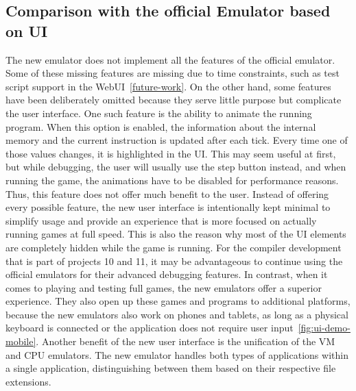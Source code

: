 
\subsection{Comparison with the official Emulator based on UI} \label{ui-compatibility}
The new emulator does not implement all the features of the official emulator.
Some of these missing features are missing due to time constraints, such as test script support in the WebUI~\ref{future-work}.
On the other hand, some features have been deliberately omitted because they serve little purpose but complicate the user interface.
One such feature is the ability to animate the running program.
When this option is enabled, the information about the internal memory and the current instruction is updated after each tick.
Every time one of those values changes, it is highlighted in the UI.
This may seem useful at first, but while debugging, the user will usually use the step button instead, and when running the game, the animations have to be disabled for performance reasons.
Thus, this feature does not offer much benefit to the user.
Instead of offering every possible feature, the new user interface is intentionally kept minimal to simplify usage and provide an experience that is more focused on actually running games at full speed.
This is also the reason why most of the UI elements are completely hidden while the game is running.
For the compiler development that is part of projects 10 and 11, it may be advantageous to continue using the official emulators for their advanced debugging features.
In contrast, when it comes to playing and testing full games, the new emulators offer a superior experience.
They also open up these games and programs to additional platforms, because the new emulators also work on phones and tablets, as long as a physical keyboard is connected or the application does not require user input~\ref{fig:ui-demo-mobile}.
Another benefit of the new user interface is the unification of the VM and CPU emulators.
The new emulator handles both types of applications within a single application, distinguishing between them based on their respective file extensions.


